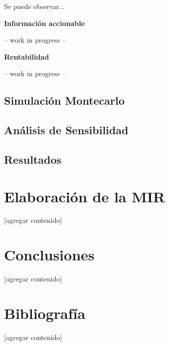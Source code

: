 \documentclass{article}
\begin{document}
Se puede observar... 

\textbf{Información accionable}

-- work in progress --

\textbf{Rentabilidad}

-- work in progress --

\subsection{Simulación Montecarlo}

\subsection{Análisis de Sensibilidad}

\subsection{Resultados}
% 
% 

\newpage
\section{Elaboración de la MIR}\label{sec:mir}
[agregar contenido]

\newpage
\section{Conclusiones}\label{sec:conclutions}
[agregar contenido]

\newpage
\section{Bibliografía}\label{sec:references}
[agregar contenido]
\end{document}
